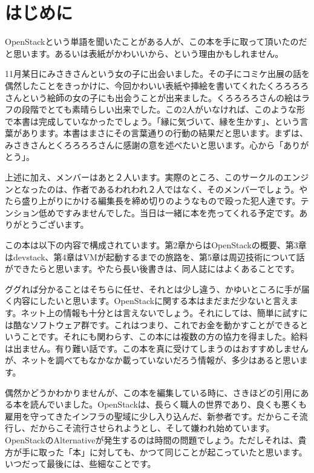 \documentclass[9pt,b5paper,tombo,openany]{jsbook}
\begin{document}
\thispagestyle{empty}
\dominitoc
\tableofcontents
\thispagestyle{empty}

\chapter{はじめに}

\setcounter{page}{1}

OpenStackという単語を聞いたことがある人が、この本を手に取って頂いたのだと思います。あるいは表紙がかわいいから、という理由かもしれません。

11月某日にみさきさんという女の子に出会いました。その子にコミケ出展の話を偶然したことをきっかけに、今回かわいい表紙や挿絵を書いてくれたくろろろろさんという絵師の女の子にも出会うことが出来ました。くろろろろさんの絵はラフの段階でとても素晴らしい出来でした。この2人がいなければ、このような形で本書は完成していなかったでしょう。「縁に気づいて、縁を生かす」、という言葉があります。本書はまさにその言葉通りの行動の結果だと思います。まずは、みさきさんとくろろろろさんに感謝の意を述べたいと思います。心から「ありがとう」。

上述に加え、メンバーはあと２人います。実際のところ、このサークルのエンジンとなったのは、作者であるわれわれ２人ではなく、そのメンバーでしょう。やたら盛り上がりにかける編集長を締め切りのようなもので殴った犯人達です。テンション低めですみませんでした。当日は一緒に本を売ってくれる予定です。ありがとうございます。

この本は以下の内容で構成されています。第2章からはOpenStackの概要、第3章はdevstack、第4章はVMが起動するまでの旅路を、第5章は周辺技術について話ができたらと思います。やたら長い後書きは、同人誌にはよくあることです。

ググれば分かることはそちらに任せ、それとは少し違う、かゆいところに手が届く内容にしたいと思います。OpenStackに関する本はまだまだ少ないと言えます。ネット上の情報も十分とは言えないでしょう。それにしては、簡単に試すには酷なソフトウェア群です。これはつまり、これでお金を動かすことができるということです。それにも関わらす、この本には複数の方の協力を得ました。給料は出ません。有り難い話です。この本を真に受けてしまうのはおすすめしませんが、ネットを調べてもなかなか載っていないだろう情報が、多少はあると思います。

偶然かどうかわかりませんが、この本を編集している時に、さきほどの引用にある本を読んでいました。OpenStackは、長らく職人の世界であり、良くも悪くも雇用を守ってきたインフラの聖域に少し入り込んだ、新参者です。だからこそ流行し、だからこそ流行させられようとし、そして嫌われ始めています。OpenStackのAlternativeが発生するのは時間の問題でしょう。ただしそれは、貴方が手に取った「本」に対しても、かつて同じことが起こっていたと思います。いつだって最後には、些細なことです。
\end{document}
